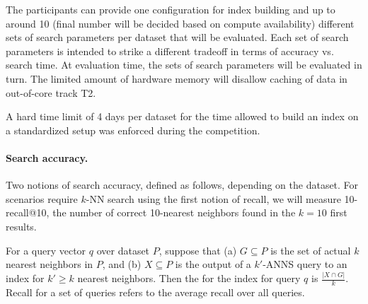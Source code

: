 
The participants can provide one configuration for index building and
up to around 10 (final number will be decided based on compute
availability) different sets of search parameters per dataset that
will be evaluated. 
Each set of search parameters is intended to
strike a different tradeoff in terms of accuracy vs. search time.  At
evaluation time, the sets of search parameters will be evaluated in
turn. The limited amount of hardware memory will disallow caching
of data in out-of-core track T2.



A hard time limit of 4 days per dataset for the time allowed to build an index on a standardized setup was enforced during the competition.

\paragraph{Search accuracy.}

Two notions of search accuracy, defined as follows,
depending on the dataset. For scenarios require $k$-NN search using
the first notion of recall, we will measure 10-recall@10, \ie 
the number of correct 10-nearest neighbors found in the $k=10$ first results.

\iffalse 

\begin{definition}[{\bf \recall{k}{k'}}]
  \label{def:recall}
  For a query vector $q$ over dataset $P$, suppose that (a) $G
  \subseteq P$ is the set of actual $k$ nearest neighbors in $P$, and
  (b) $X \subseteq P$ is the output of a $k'$-ANNS query to an index
  for $k' \geq k$ nearest neighbors. Then the  for the
  index for query $q$ is $\frac{|X \cap G|}{k}$. Recall for a set of
  queries refers to the average recall over all queries.
\end{definition}

